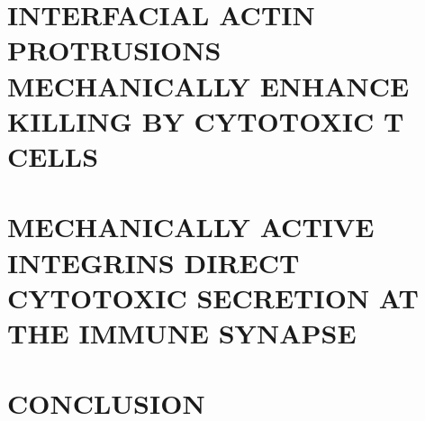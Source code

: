 \documentclass[phd,tocprelim]{cornell}
\begin{document}
\chapter{INTERFACIAL ACTIN PROTRUSIONS MECHANICALLY ENHANCE KILLING BY CYTOTOXIC T CELLS }
\label{chap:protrusions}


\chapter{MECHANICALLY ACTIVE INTEGRINS DIRECT CYTOTOXIC SECRETION AT THE IMMUNE SYNAPSE}
\label{chap:lfa1}


\chapter{CONCLUSION}
\label{chap:conclusion}

%
%


\end{document}
